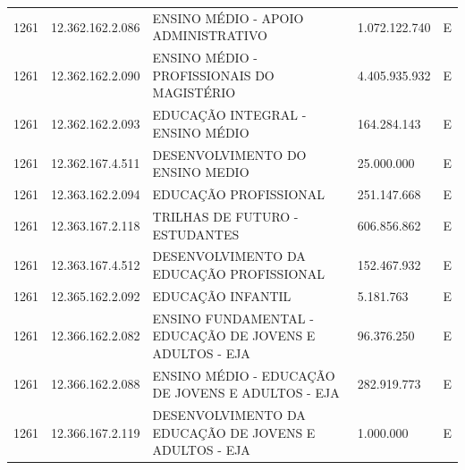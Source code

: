 \documentclass{article}
\begin{document}
\begin{longtable}[c]{m{1cm}|m{2cm}|m{10cm}|m{2cm}|m{1cm}}
\multicolumn{1}{C{1cm}|}{1261} & \multicolumn{1}{C{2cm}|}{12.362.162.2.086} & \multicolumn{1}{L{10cm}|}{ENSINO MÉDIO - APOIO ADMINISTRATIVO} & \multicolumn{1}{R{2cm}|}{1.072.122.740} & \multicolumn{1}{C{1cm}}{E} \\
\multicolumn{1}{C{1cm}|}{1261} & \multicolumn{1}{C{2cm}|}{12.362.162.2.090} & \multicolumn{1}{L{10cm}|}{ENSINO MÉDIO - PROFISSIONAIS DO MAGISTÉRIO} & \multicolumn{1}{R{2cm}|}{4.405.935.932} & \multicolumn{1}{C{1cm}}{E} \\
\multicolumn{1}{C{1cm}|}{1261} & \multicolumn{1}{C{2cm}|}{12.362.162.2.093} & \multicolumn{1}{L{10cm}|}{EDUCAÇÃO INTEGRAL - ENSINO MÉDIO} & \multicolumn{1}{R{2cm}|}{164.284.143} & \multicolumn{1}{C{1cm}}{E} \\
\multicolumn{1}{C{1cm}|}{1261} & \multicolumn{1}{C{2cm}|}{12.362.167.4.511} & \multicolumn{1}{L{10cm}|}{DESENVOLVIMENTO DO ENSINO MEDIO} & \multicolumn{1}{R{2cm}|}{25.000.000} & \multicolumn{1}{C{1cm}}{E} \\
\multicolumn{1}{C{1cm}|}{1261} & \multicolumn{1}{C{2cm}|}{12.363.162.2.094} & \multicolumn{1}{L{10cm}|}{EDUCAÇÃO PROFISSIONAL} & \multicolumn{1}{R{2cm}|}{251.147.668} & \multicolumn{1}{C{1cm}}{E} \\
\multicolumn{1}{C{1cm}|}{1261} & \multicolumn{1}{C{2cm}|}{12.363.167.2.118} & \multicolumn{1}{L{10cm}|}{TRILHAS DE FUTURO - ESTUDANTES} & \multicolumn{1}{R{2cm}|}{606.856.862} & \multicolumn{1}{C{1cm}}{E} \\
\multicolumn{1}{C{1cm}|}{1261} & \multicolumn{1}{C{2cm}|}{12.363.167.4.512} & \multicolumn{1}{L{10cm}|}{DESENVOLVIMENTO DA EDUCAÇÃO PROFISSIONAL} & \multicolumn{1}{R{2cm}|}{152.467.932} & \multicolumn{1}{C{1cm}}{E} \\
\multicolumn{1}{C{1cm}|}{1261} & \multicolumn{1}{C{2cm}|}{12.365.162.2.092} & \multicolumn{1}{L{10cm}|}{EDUCAÇÃO INFANTIL} & \multicolumn{1}{R{2cm}|}{5.181.763} & \multicolumn{1}{C{1cm}}{E} \\
\multicolumn{1}{C{1cm}|}{1261} & \multicolumn{1}{C{2cm}|}{12.366.162.2.082} & \multicolumn{1}{L{10cm}|}{ENSINO FUNDAMENTAL - EDUCAÇÃO DE JOVENS E ADULTOS - EJA} & \multicolumn{1}{R{2cm}|}{96.376.250} & \multicolumn{1}{C{1cm}}{E} \\
\multicolumn{1}{C{1cm}|}{1261} & \multicolumn{1}{C{2cm}|}{12.366.162.2.088} & \multicolumn{1}{L{10cm}|}{ENSINO MÉDIO - EDUCAÇÃO DE JOVENS E ADULTOS - EJA} & \multicolumn{1}{R{2cm}|}{282.919.773} & \multicolumn{1}{C{1cm}}{E} \\
\multicolumn{1}{C{1cm}|}{1261} & \multicolumn{1}{C{2cm}|}{12.366.167.2.119} & \multicolumn{1}{L{10cm}|}{DESENVOLVIMENTO DA EDUCAÇÃO DE JOVENS E ADULTOS - EJA} & \multicolumn{1}{R{2cm}|}{1.000.000} & \multicolumn{1}{C{1cm}}{E} \\

\end{longtable}
\end{document}
